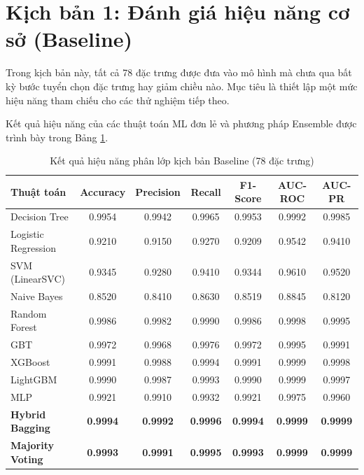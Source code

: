 \section{Kịch bản 1: Đánh giá hiệu năng cơ sở (Baseline)}
Trong kịch bản này, tất cả 78 đặc trưng được đưa vào mô hình mà chưa qua bất kỳ bước tuyển chọn đặc trưng hay giảm chiều nào. Mục tiêu là thiết lập một mức hiệu năng tham chiếu cho các thử nghiệm tiếp theo.

Kết quả hiệu năng của các thuật toán ML đơn lẻ và phương pháp Ensemble được trình bày trong Bảng \ref{tab:exp0_ml_metrics}.
\begin{table}[htbp]
\centering
\caption{Kết quả hiệu năng phân lớp kịch bản Baseline (78 đặc trưng)}
\label{tab:exp0_ml_metrics}
\begin{tabular*}{\textwidth}{@{\extracolsep{\fill}}lcccccc@{}}
\toprule
\textbf{Thuật toán} & \textbf{Accuracy} & \textbf{Precision} & \textbf{Recall} & \textbf{F1-Score} & \textbf{AUC-ROC} & \textbf{AUC-PR} \\ 
\midrule
Decision Tree          & 0.9954 & 0.9942 & 0.9965 & 0.9953 & 0.9992 & 0.9985 \\
Logistic Regression    & 0.9210 & 0.9150 & 0.9270 & 0.9209 & 0.9542 & 0.9410 \\
SVM (LinearSVC)        & 0.9345 & 0.9280 & 0.9410 & 0.9344 & 0.9610 & 0.9520 \\
Naive Bayes            & 0.8520 & 0.8410 & 0.8630 & 0.8519 & 0.8845 & 0.8120 \\
Random Forest          & 0.9986 & 0.9982 & 0.9990 & 0.9986 & 0.9998 & 0.9995 \\
GBT                    & 0.9972 & 0.9968 & 0.9976 & 0.9972 & 0.9995 & 0.9991 \\
XGBoost                & 0.9991 & 0.9988 & 0.9994 & 0.9991 & 0.9999 & 0.9998 \\
LightGBM               & 0.9990 & 0.9987 & 0.9993 & 0.9990 & 0.9999 & 0.9997 \\
MLP                    & 0.9921 & 0.9910 & 0.9932 & 0.9921 & 0.9975 & 0.9960 \\
\midrule
\textbf{Hybrid Bagging}   & \textbf{0.9994} & \textbf{0.9992} & \textbf{0.9996} & \textbf{0.9994} & \textbf{0.9999} & \textbf{0.9999} \\
\textbf{Majority Voting}  & \textbf{0.9993} & \textbf{0.9991} & \textbf{0.9995} & \textbf{0.9993} & \textbf{0.9999} & \textbf{0.9999} \\
\bottomrule
\end{tabular*}
\end{table}

